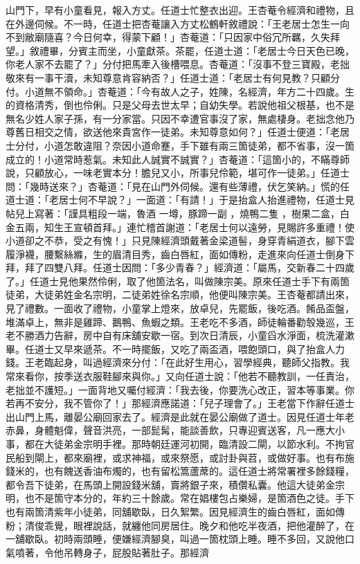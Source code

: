 山門下，早有小童看見，報入方丈。任道士忙整衣出迎。王杏菴令經濟和禮物，且在外邊伺候。不一時，任道士把杏菴讓入方丈松鶴軒敘禮說：「王老居士怎生一向不到敝廟隨喜？今日何幸，得蒙下顧！」杏菴道：「只因家中俗冗所羈，久失拜望。」敘禮畢，分賓主而坐，小童獻茶。茶罷，任道士道：「老居士今日天色已晚，你老人家不去罷了？」分付把馬牽入後槽喂息。杏菴道：「沒事不登三寶殿，老拙敬來有一事干瀆，未知尊意肯容納否？」任道士道：「老居士有何見教？只顧分付。小道無不領命。」杏菴道：「今有故人之子，姓陳，名經濟，年方二十四歲。生的資格清秀，倒也伶俐。只是父母去世太早；自幼失學。若說他祖父根基，也不是無名少姓人家子孫，有一分家當。只因不幸遭官事沒了家，無處棲身。老拙念他乃尊舊日相交之情，欲送他來貴宮作一徒弟。未知尊意如何？」任道士便道：「老居士分付，小道怎敢違阻？奈因小道命蹇，手下雖有兩三箇徒弟，都不省事，沒一箇成立的！小道常時惹氣。未知此人誠實不誠實？」杏菴道：「這箇小的，不瞞尊師說，只顧放心，一味老實本分！膽兒又小，所事兒伶範，堪可作一徒弟。」任道士問：「幾時送來？」杏菴道：「見在山門外伺候。還有些薄禮，伏乞笑納。」慌的任道士道：「老居士何不早說？」一面道：「有請！」于是抬盒人抬進禮物，任道士見帖兒上寫著：「謹具粗段一端，魯酒 一墫，豚蹄一副 ，燒鴨二隻 ，樹果二盒，白金五兩，知生王宣頓首拜。」連忙稽首謝道：「老居士何以遠勞，見賜許多重禮！使小道卻之不恭，受之有愧！」只見陳經濟頭戴著金梁道髻，身穿青絹道衣，腳下雲履淨襪，腰繫絲縧，生的眉清目秀，齒白唇紅，面如傳粉，走進來向任道士倒身下拜，拜了四雙八拜。任道士因問：「多少青春？」經濟道：「屬馬，交新春二十四歲了。」任道士見他果然伶俐，取了他箇法名，叫做陳宗美。原來任道士手下有兩箇徒弟，大徒弟姓金名宗明，二徒弟姓徐名宗順，他便叫陳宗美。王杏菴都請出來，見了禮數。一面收了禮物，小童掌上燈來，放卓兒，先罷飯，後吃酒。餚品盃盤，堆滿卓上，無非是雞蹄、鵝鴨、魚蝦之類。王老吃不多酒，師徒輪番勸彀幾巡，王老不勝酒力告辭，房中自有床舖安歇一宿。到次日清辰，小童舀水淨面，梳洗灌漱畢。任道士又早來遞茶。不一時擺飯，又吃了兩盃酒，喂飽頭口，與了抬盒人力錢。王老臨起身，叫過經濟來分付：「在此好生用心，習學經典，聽師父指教。我常來看你，按季送衣服鞋腳來與你。」又向任道士說：「他若不聽教訓，一任責治，老拙並不護短。」一面背地又囑付經濟：「我去後，你要洗心改正，習本等事業。你若再不安分，我不管你了！」那經濟應諾道：「兒子理會了。」王老當下作辭任道士出山門上馬，離晏公廟回家去了。經濟是此就在晏公廟做了道士。因見任道士年老赤鼻，身體魁偉，聲音洪亮，一部髭髯，能談善飲，只專迎賓送客，凡一應大小事，都在大徒弟金宗明手裡。那時朝廷運河初開，臨清設二閘，以節水利。不拘官民船到閘上，都來廟裡，或求神福，或來祭愿，或討卦與苕，或做好事。也有布施錢米的，也有餽送香油布燭的，也有留松篙蘆蓆的。這任道士將常署裡多餘錢糧，都令吾下徒弟，在馬頭上開設錢米舖，賣將銀子來，積儹私囊。他這大徒弟金宗明，也不是箇守本分的，年約三十餘歲。常在娼樓包占樂婦，是箇酒色之徒。手下也有兩箇清紫年小徒弟，同舖歇臥，日久絮繁。因見經濟生的齒白唇紅，面如傳粉；清俊乖覺，眼裡說話，就纏他同房居住。晚夕和他吃半夜酒，把他灌醉了，在一舖歇臥。初時兩頭睡，便嫌經濟腳臭，叫過一箇枕頭上睡。睡不多回，又說他口氣噴著，令他吊轉身子，屁股貼著肚子。那經濟